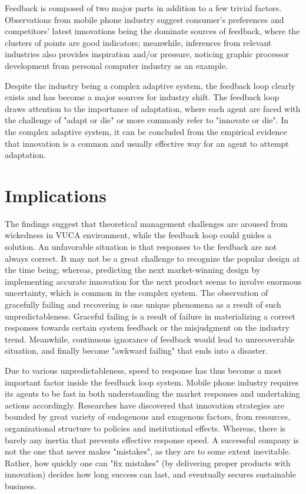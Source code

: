 \documentclass[utf8,english]{gradu3}
\begin{document}
Feedback is composed of two major parts in addition to a few trivial factors. Observations from mobile phone industry suggest consumer's preferences and competitors' latest innovations being the dominate sources of feedback, where the clusters of points are good indicators; meanwhile, inferences from relevant industries also provides inspiration and/or pressure, noticing graphic processor development from personal computer industry as an example.

Despite the industry being a complex adaptive system, the feedback loop clearly exists and has become a major sources for industry shift. The feedback loop draws attention to the importance of adaptation, where each agent are faced with the challenge of "adapt or die" or more commonly refer to "innovate or die". In the complex adaptive system, it can be concluded from the empirical evidence that innovation is a common and usually effective way for an agent to attempt adaptation. 

\chapter{Implications}

The findings suggest that theoretical management challenges are aroused from wickedness in VUCA environment, while the feedback loop could guides a solution. An unfavorable situation is that responses to the feedback are not always correct. It may not be a great challenge to recognize the popular design at the time being; whereas, predicting the next market-winning design by implementing accurate innovation for the next product seems to involve enormous uncertainty, which is common in the complex system. The observation of gracefully failing and recovering is one unique phenomena as a result of such unpredictableness. Graceful failing is a result of failure in materializing a correct responses towards certain system feedback or the misjudgment on the industry trend. Meanwhile,  continuous ignorance of feedback would lead to unrecoverable situation, and finally become "awkward failing" that ends into a disaster.  

Due to various unpredictableness, speed to response has thus become a most important factor inside the feedback loop system. Mobile phone industry requires its agents to be fast in both understanding the market responses and undertaking actions accordingly. Researches have discovered that innovation strategies are bounded by great variety of endogenous and exogenous factors, from resources, organizational structure to policies and institutional effects. Whereas, there is barely any inertia that prevents effective response speed. A successful company is not the one that never makes "mistakes", as they are to some extent inevitable. Rather, how quickly one can "fix mistakes" (by delivering proper products with innovation) decides how long success can last, and eventually secures sustainable business.
\end{document}
